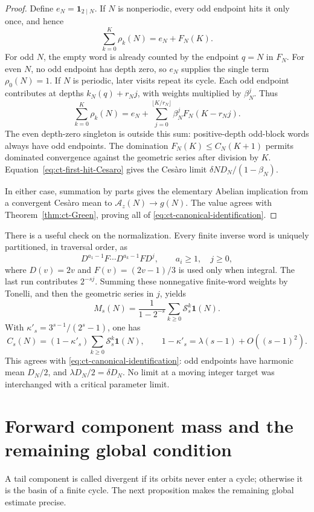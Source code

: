\documentclass[11pt,a4paper]{article}
\begin{document}
\begin{proof}
Define \(e_N=\mathbf1_{2\mid N}\). If \(N\) is nonperiodic,
every odd endpoint hits it only once, and hence
\[
 \sum_{k=0}^K\rho_k(N)=e_N+F_N(K).
\]
For odd \(N\), the empty word is already counted by the endpoint
\(q=N\) in \(F_N\). For even \(N\), no odd endpoint has depth
zero, so \(e_N\) supplies the single term \(\rho_0(N)=1\).
If \(N\) is periodic, later visits repeat its cycle. Each odd
endpoint contributes at depths \(k_N(q)+r_Nj\), with weights
multiplied by \(\beta_N^j\). Thus
\[
 \sum_{k=0}^K\rho_k(N)
 =e_N+\sum_{j=0}^{\lfloor K/r_N\rfloor}
                   \beta_N^jF_N(K-r_Nj).
\]
The even depth-zero singleton is outside this sum: positive-depth
odd-block words always have odd endpoints.
The domination \(F_N(K)\le C_N(K+1)\) permits dominated
convergence against the geometric series after division by \(K\).
Equation~\eqref{eq:ct-first-hit-Cesaro} gives the Cesàro limit
\(\delta ND_N/(1-\beta_N)\).

In either case, summation by parts gives the elementary Abelian
implication from a convergent Cesàro mean to
\(\mathcal A_z(N)\to g(N)\). The value agrees with
Theorem~\ref{thm:ct-Green}, proving all of
\eqref{eq:ct-canonical-identification}.
\end{proof}

There is a useful check on the normalization. Every finite inverse
word is uniquely partitioned, in traversal order, as
\[
 D^{a_1-1}F\cdots D^{a_k-1}F D^j,\qquad
 a_i\ge1,\quad j\ge0,
\]
where \(D(v)=2v\) and \(F(v)=(2v-1)/3\) is used only when
integral. The last run contributes \(2^{-sj}\).
Summing these nonnegative finite-word weights by Tonelli, and then
the geometric series in \(j\), yields
\[
 M_s(N)=\frac1{1-2^{-s}}\sum_{k\ge0}\mathcal S_s^k\mathbf1(N).
\]
With \(\kappa'_s=3^{s-1}/(2^s-1)\), one has
\[
 C_s(N)=(1-\kappa'_s)\sum_{k\ge0}\mathcal S_s^k\mathbf1(N),
 \qquad 1-\kappa'_s=\lambda(s-1)+O((s-1)^2).
\]
This agrees with \eqref{eq:ct-canonical-identification}: odd
endpoints have harmonic mean \(D_N/2\), and
\(\lambda D_N/2=\delta D_N\). No limit at a moving integer
target was interchanged with a critical parameter limit.

\section{Forward component mass and the remaining global condition}

A tail component is called divergent if its orbits never enter a
cycle; otherwise it is the basin of a finite cycle. The next
proposition makes the remaining global estimate precise.
\end{document}

